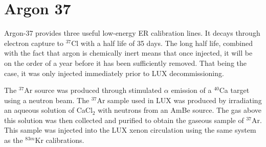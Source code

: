 \section{Argon 37}
Argon-37 provides three useful low-energy ER calibration lines. It decays through electron capture to $^{37}$Cl with a half life of 35 days. The long half life, combined with the fact that argon is chemically inert means that once injected, it will be on the order of a year before it has been sufficiently removed. That being the case, it was only injected immediately prior to LUX decommissioning.\cite{ar371,pixey_ar37}

The $^{37}$Ar source was produced through stimulated $\alpha$ emission of a $^{40}$Ca target using a neutron beam. The $^{37}$Ar sample used in LUX was produced by irradiating an aqueous solution of CaCl$_2$ with neutrons from an AmBe source. The gas above this solution was then collected and purified to obtain the gaseous sample of $^{37}$Ar\cite{pixey_ar37}. This sample was injected into the LUX xenon circulation using the same system as the $^{83m}$Kr calibrations\cite{lux_kr2}.

